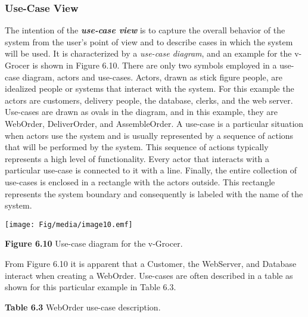 \subsubsection{Use-Case View}\label{use-case-view}

The intention of the \emph{\textbf{use-case view}} is to capture the
overall behavior of the system from the user's point of view and to
describe cases in which the system will be used. It is characterized by
a \emph{use-case diagram}, and an example for the v-Grocer is shown in
Figure 6.10. There are only two symbols employed in a use-case diagram,
actors and use-cases. Actors, drawn as stick figure people, are
idealized people or systems that interact with the system. For this
example the actors are customers, delivery people, the database, clerks,
and the web server. Use-cases are drawn as ovals in the diagram, and in
this example, they are WebOrder, DeliverOrder, and AssembleOrder. A
use-case is a particular situation when actors use the system and is
usually represented by a sequence of actions that will be performed by
the system. This sequence of actions typically represents a high level
of functionality. Every actor that interacts with a particular use-case
is connected to it with a line. Finally, the entire collection of
use-cases is enclosed in a rectangle with the actors outside. This
rectangle represents the system boundary and consequently is labeled
with the name of the system.

\texttt{[image: Fig/media/image10.emf]}

\textbf{Figure 6.10} Use-case diagram for the v-Grocer.

From Figure 6.10 it is apparent that a Customer, the WebServer, and
Database interact when creating a WebOrder. Use-cases are often
described in a table as shown for this particular example in Table 6.3.

\textbf{Table 6.3} WebOrder use-case description.

